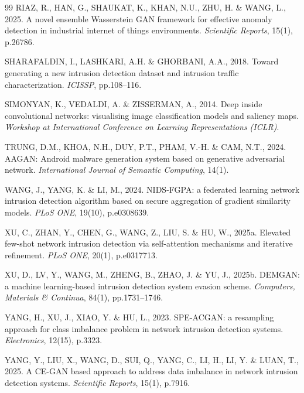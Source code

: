 \documentclass[10pt,twocolumn,a4paper]{extarticle}
\begin{document}
\begin{thebibliography}{99}
RIAZ, R., HAN, G., SHAUKAT, K., KHAN, N.U., ZHU, H. \& WANG, L., 2025. A novel ensemble Wasserstein GAN framework for effective anomaly detection in industrial internet of things environments. \textit{Scientific Reports}, 15(1), p.26786.

SHARAFALDIN, I., LASHKARI, A.H. \& GHORBANI, A.A., 2018. Toward generating a new intrusion detection dataset and intrusion traffic characterization. \textit{ICISSP}, pp.108--116.

SIMONYAN, K., VEDALDI, A. \& ZISSERMAN, A., 2014. Deep inside convolutional networks: visualising image classification models and saliency maps. \textit{Workshop at International Conference on Learning Representations (ICLR)}.

TRUNG, D.M., KHOA, N.H., DUY, P.T., PHAM, V.-H. \& CAM, N.T., 2024. AAGAN: Android malware generation system based on generative adversarial network. \textit{International Journal of Semantic Computing}, 14(1).

WANG, J., YANG, K. \& LI, M., 2024. NIDS-FGPA: a federated learning network intrusion detection algorithm based on secure aggregation of gradient similarity models. \textit{PLoS ONE}, 19(10), p.e0308639.

XU, C., ZHAN, Y., CHEN, G., WANG, Z., LIU, S. \& HU, W., 2025a. Elevated few-shot network intrusion detection via self-attention mechanisms and iterative refinement. \textit{PLoS ONE}, 20(1), p.e0317713.

XU, D., LV, Y., WANG, M., ZHENG, B., ZHAO, J. \& YU, J., 2025b. DEMGAN: a machine learning-based intrusion detection system evasion scheme. \textit{Computers, Materials \& Continua}, 84(1), pp.1731--1746.

YANG, H., XU, J., XIAO, Y. \& HU, L., 2023. SPE-ACGAN: a resampling approach for class imbalance problem in network intrusion detection systems. \textit{Electronics}, 12(15), p.3323.

YANG, Y., LIU, X., WANG, D., SUI, Q., YANG, C., LI, H., LI, Y. \& LUAN, T., 2025. A CE-GAN based approach to address data imbalance in network intrusion detection systems. \textit{Scientific Reports}, 15(1), p.7916.

\end{thebibliography}
\end{document}
